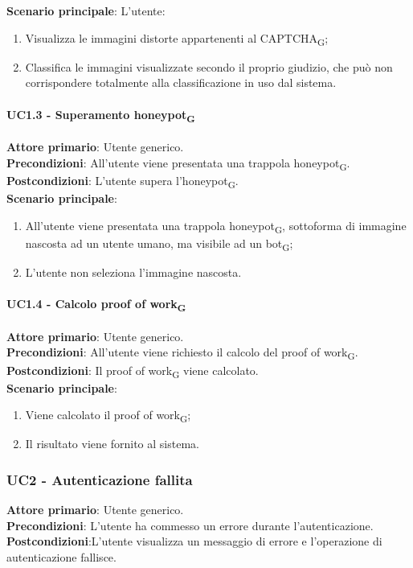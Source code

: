 \textbf{Scenario principale}: L'utente:
\begin{enumerate}
   \item Visualizza le immagini distorte appartenenti al CAPTCHA\textsubscript{G};
   \item Classifica le immagini visualizzate secondo il proprio giudizio, che può non corrispondere totalmente alla classificazione in uso dal sistema.
\end{enumerate}

\paragraph{UC1.3 - Superamento honeypot\textsubscript{G}}
\textbf{Attore primario}: Utente generico.\\
\textbf{Precondizioni}: All'utente viene presentata una trappola honeypot\textsubscript{G}.\\
\textbf{Postcondizioni}: L'utente supera l'honeypot\textsubscript{G}.\\

\textbf{Scenario principale}:
\begin{enumerate}
   \item All'utente viene presentata una trappola honeypot\textsubscript{G}, sottoforma di immagine nascosta ad un utente umano, ma visibile ad un bot\textsubscript{G};
   \item L'utente non seleziona l'immagine nascosta.
\end{enumerate}

\paragraph{UC1.4 - Calcolo proof of work\textsubscript{G}}
\textbf{Attore primario}: Utente generico.\\
\textbf{Precondizioni}: All'utente viene richiesto il calcolo del proof of work\textsubscript{G}.\\
\textbf{Postcondizioni}: Il proof of work\textsubscript{G} viene calcolato.\\

\textbf{Scenario principale}:
\begin{enumerate}
   \item Viene calcolato il proof of work\textsubscript{G};
   \item Il risultato viene fornito al sistema.
\end{enumerate}

\subsubsection{UC2 - Autenticazione fallita}
\textbf{Attore primario}: Utente generico.\\
\textbf{Precondizioni}: L’utente ha commesso un errore durante l'autenticazione.\\
\textbf{Postcondizioni}:L’utente visualizza un messaggio di errore e l’operazione di autenticazione fallisce.\\

